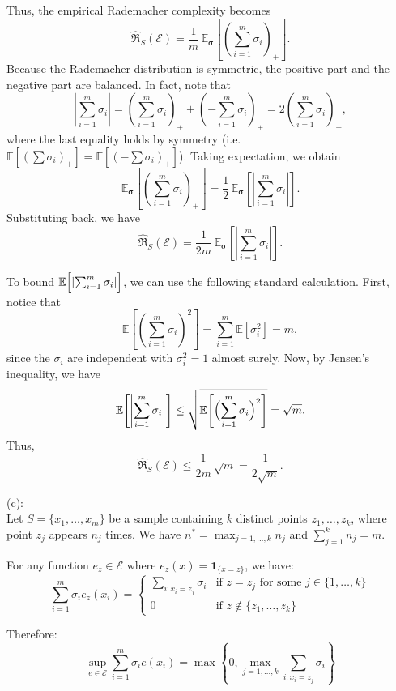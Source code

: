 \documentclass[letterpaper, 11pt]{article}
\newcommand{\1}{\mathds{1}}	%
\theoremstyle{definition}
\begin{document}
Thus, the empirical Rademacher complexity becomes
\[
\widehat{\mathfrak{R}}_S(\mathcal{E}) 
=\frac{1}{m}\,\mathbb{E}_{\boldsymbol{\sigma}}\!\left[\left(\sum_{i=1}^m \sigma_i\right)_+\right].
\]
Because the Rademacher distribution is symmetric, the positive part and the negative part are balanced. In fact, note that
\[
\left|\sum_{i=1}^m \sigma_i\right| 
=\left(\sum_{i=1}^m \sigma_i\right)_+ + \left(-\sum_{i=1}^m \sigma_i\right)_+
=2\left(\sum_{i=1}^m \sigma_i\right)_+,
\]
where the last equality holds by symmetry (i.e. \(\mathbb{E}[\left(\sum \sigma_i\right)_+]=\mathbb{E}\left[\left(-\sum \sigma_i\right)_+\right]\)). Taking expectation, we obtain
\[
\mathbb{E}_{\boldsymbol{\sigma}}\!\left[\left(\sum_{i=1}^m \sigma_i\right)_+\right]
=\frac{1}{2}\,\mathbb{E}_{\boldsymbol{\sigma}}\!\left[\left|\sum_{i=1}^m \sigma_i\right|\right].
\]
Substituting back, we have
\[
\widehat{\mathfrak{R}}_S(\mathcal{E})
=\frac{1}{2m}\,\mathbb{E}_{\boldsymbol{\sigma}}\!\left[\left|\sum_{i=1}^{m}\sigma_i\right|\right].
\]

To bound \(\mathbb{E}\Bigl[\left|\sum_{i=1}^{m}\sigma_i\right|\Bigr]\), we can use the following standard calculation. First, notice that
\[
\mathbb{E}\!\left[\left(\sum_{i=1}^{m}\sigma_i\right)^2\right]
=\sum_{i=1}^{m} \mathbb{E}[\sigma_i^2] 
= m,
\]
since the \(\sigma_i\) are independent with \(\sigma_i^2=1\) almost surely.
Now, by Jensen’s inequality, we have
\[
\mathbb{E}\!\left[\left|\sum_{i=1}^{m}\sigma_i\right|\right]
\le \sqrt{\mathbb{E}\!\left[\Bigl(\sum_{i=1}^{m}\sigma_i\Bigr)^2\right]}
=\sqrt{m}.
\]
Thus,
\[
\widehat{\mathfrak{R}}_S(\mathcal{E})
\le \frac{1}{2m}\,\sqrt{m}
=\frac{1}{2\sqrt{m}}.
\]

(c):
\\
Let $S = \{x_1, \ldots, x_m\}$ be a sample containing $k$ distinct points $z_1, \ldots, z_k$, where point $z_j$ appears $n_j$ times. We have $n^* = \max_{j=1,\ldots,k} n_j$ and $\sum_{j=1}^k n_j = m$.

For any function $e_z \in \mathcal{E}$ where $e_z(x) = \mathbf{1}_{\{x=z\}}$, we have:
\[
\sum_{i=1}^m \sigma_i e_z(x_i) = 
\begin{cases}
\sum_{i: x_i = z_j} \sigma_i & \text{if } z = z_j \text{ for some } j \in \{1,\ldots,k\} \\
0 & \text{if } z \notin \{z_1,\ldots,z_k\}
\end{cases}
\]

Therefore:
\[
\sup_{e \in \mathcal{E}} \sum_{i=1}^m \sigma_i e(x_i) = \max\left\{0, \max_{j=1,\ldots,k} \sum_{i: x_i = z_j} \sigma_i\right\}
\]
\end{document}

